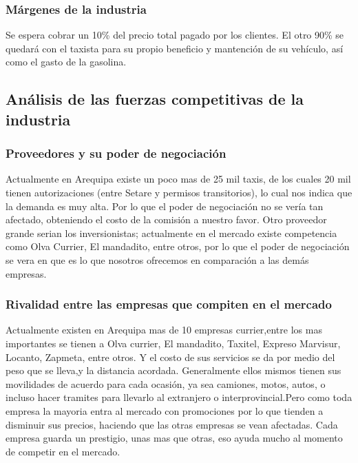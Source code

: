 \subsubsection{Márgenes de la industria}
Se espera cobrar un 10\% del precio total pagado por los clientes. El otro 90\% se quedará con el taxista para su propio beneficio y mantención de su vehículo, así como el gasto de la gasolina.


\subsection{Análisis de las fuerzas competitivas de la industria}

\subsubsection{Proveedores y su poder de negociación}
Actualmente en Arequipa existe un poco mas de 25 mil taxis, de los cuales 20 mil tienen autorizaciones (entre Setare y permisos transitorios), lo cual nos indica que la demanda es muy alta. Por lo que el poder de negociación  no se vería tan afectado, obteniendo el costo de la comisión a nuestro favor. 
Otro proveedor grande serian los inversionistas; actualmente en el mercado existe competencia como Olva Currier, El mandadito, entre otros, por lo que el poder de negociación se vera en que es lo que nosotros ofrecemos en comparación a las demás empresas.

\subsubsection{Rivalidad entre las empresas que compiten en el mercado}
Actualmente existen en Arequipa mas de 10 empresas currier,entre los mas importantes se tienen a Olva currier, El mandadito, Taxitel, Expreso Marvisur, Locanto, Zapmeta, entre otros. Y el costo de sus servicios se da por medio del peso que se lleva,y la distancia acordada. Generalmente ellos mismos tienen sus movilidades de acuerdo para cada ocasión, ya sea camiones, motos, autos, o incluso hacer tramites para llevarlo al extranjero o interprovincial.Pero como toda empresa la mayoria entra al mercado con promociones por lo que tienden a disminuir sus precios, haciendo que las otras empresas se vean afectadas. 
Cada empresa guarda un prestigio, unas mas que otras, eso ayuda mucho al momento de competir en el mercado.

